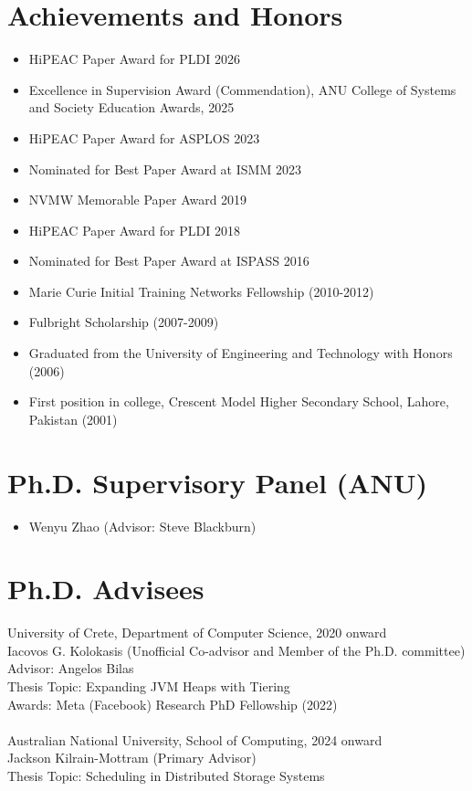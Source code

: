 \documentclass[singlecolumn,singlespace,11pt,a4paper]{article}
\begin{document}
\section*{Achievements and Honors}
\begin{itemize}
\item HiPEAC Paper Award for PLDI 2026
\item Excellence in Supervision Award (Commendation), ANU College of Systems and Society Education Awards, 2025
\item HiPEAC Paper Award for ASPLOS 2023
\item Nominated for Best Paper Award at ISMM 2023
\item NVMW Memorable Paper Award 2019
\item HiPEAC Paper Award for PLDI 2018 
\item Nominated for Best Paper Award at ISPASS 2016 
\item Marie Curie Initial Training Networks Fellowship (2010-2012)
\item Fulbright Scholarship (2007-2009)
\item Graduated from the University of Engineering and Technology with Honors (2006)
\item First position in college, Crescent Model Higher Secondary School, Lahore, Pakistan (2001)
\end{itemize}

\section*{Ph.D. Supervisory Panel (ANU)}

\begin{itemize}
\item Wenyu Zhao (Advisor: Steve Blackburn)
\end{itemize}

\section*{Ph.D. Advisees}
University of Crete, Department of Computer Science, 2020 onward\\
\indent Iacovos G. Kolokasis (Unofficial Co-advisor and Member of the Ph.D. committee) \\
\indent Advisor: Angelos Bilas \\ 
\indent Thesis Topic: Expanding JVM Heaps with Tiering \\ 
\indent Awards: Meta (Facebook) Research PhD Fellowship (2022)
\\
\\
Australian National University, School of Computing, 2024 onward\\
\indent Jackson Kilrain-Mottram (Primary Advisor) \\
\indent Thesis Topic: Scheduling in Distributed Storage Systems
\end{document}

